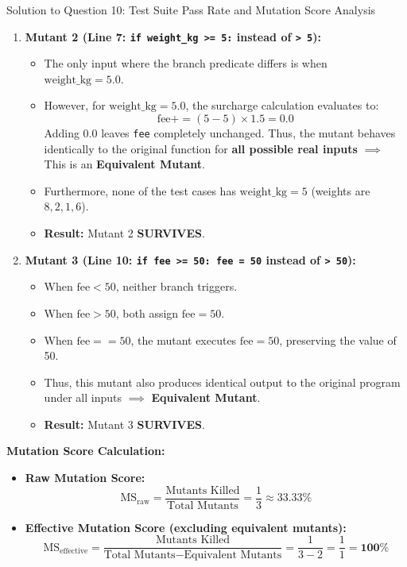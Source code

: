 \documentclass[11pt,a4paper]{article}
\begin{document}
\begin{solutionbox}{Solution to Question 10: Test Suite Pass Rate and Mutation Score Analysis}
\begin{enumerate}[label=\textbf{\arabic*.}]
    \item \textbf{Mutant 2 (Line 7: \texttt{if weight\_kg >= 5:} instead of \texttt{> 5}):}
    \begin{itemize}[itemsep=1pt]
        \item The only input where the branch predicate differs is when $\text{weight\_kg} = 5.0$.
        \item However, for $\text{weight\_kg} = 5.0$, the surcharge calculation evaluates to:
        \begin{equation*}
            \text{fee} += (5 - 5) \times 1.5 = 0.0
        \end{equation*}
        Adding $0.0$ leaves \texttt{fee} completely unchanged. Thus, the mutant behaves identically to the original function for \textbf{all possible real inputs} $\implies$ This is an \textbf{Equivalent Mutant}.
        \item Furthermore, none of the test cases has $\text{weight\_kg} = 5$ (weights are $8, 2, 1, 6$).
        \item \textbf{Result:} Mutant 2 \textcolor{accentred}{\textbf{SURVIVES}}.
    \end{itemize}
    
    \item \textbf{Mutant 3 (Line 10: \texttt{if fee >= 50: fee = 50} instead of \texttt{> 50}):}
    \begin{itemize}[itemsep=1pt]
        \item When $\text{fee} < 50$, neither branch triggers.
        \item When $\text{fee} > 50$, both assign $\text{fee} = 50$.
        \item When $\text{fee} == 50$, the mutant executes $\text{fee} = 50$, preserving the value of 50.
        \item Thus, this mutant also produces identical output to the original program under all inputs $\implies$ \textbf{Equivalent Mutant}.
        \item \textbf{Result:} Mutant 3 \textcolor{accentred}{\textbf{SURVIVES}}.
    \end{itemize}
\end{enumerate}

\textbf{Mutation Score Calculation:}
\begin{itemize}[itemsep=2pt]
    \item \textbf{Raw Mutation Score:}
    \begin{equation}
        \text{MS}_{\text{raw}} = \frac{\text{Mutants Killed}}{\text{Total Mutants}} = \frac{1}{3} \approx \mathbf{33.33\%}
    \end{equation}
    \item \textbf{Effective Mutation Score (excluding equivalent mutants):}
    \begin{equation}
        \text{MS}_{\text{effective}} = \frac{\text{Mutants Killed}}{\text{Total Mutants} - \text{Equivalent Mutants}} = \frac{1}{3 - 2} = \frac{1}{1} = \mathbf{100\%}
    \end{equation}
\end{itemize}
\end{solutionbox}
\end{document}
